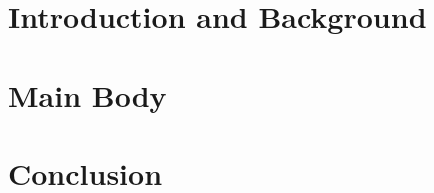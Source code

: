 \documentclass[ oneside,titlepage,numbers=noenddot,headinclude,%
                footinclude=true,abstract=false,
                BCOR=0mm,paper=letter,fontsize=12pt,%
                american,%
                ]{scrreprt}
\begin{document}
\part{Introduction and Background}



\part{Main Body}




\part{Conclusion}



% 

\clearpage
\end{document}
